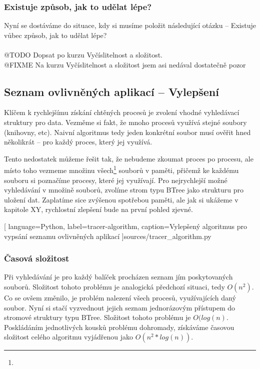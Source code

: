 \documentclass[10pt,a4paper]{article}
\begin{document}

			\subsubsection*{Existuje způsob, jak to udělat lépe?}
			Nyní se dostáváme do situace, kdy si musíme položit následující otázku -- Existuje vůbec způsob, jak to udělat lépe?
			\\
			\\
			@TODO Dopsat po kurzu Vyčíslitelnost a složitost.\\
			@FIXME Na kurzu Vyčíslitelnost a složitost jsem asi nedával dostatečně pozor

		\subsection{Seznam ovlivněných aplikací -- Vylepšení}
		Klíčem k rychlejšímu získání chtěných procesů je zvolení vhodné vyhledávací struktury pro data. Vezměme si fakt, že mnoho procesů využívá stejné soubory (knihovny, etc). Naivní algoritmus tedy jeden konkrétní soubor musí ověřit hned několikrát -- pro každý proces, který jej využívá.

		Tento nedostatek můžeme řešit tak, že nebudeme zkoumat proces po procesu, ale místo toho vezmeme množinu všech\footnote{} souborů v paměti, přičemž ke každému souboru si poznačíme procesy, které jej využívají. Pro nejrychlejší možné vyhledávání v množině souborů, zvolíme strom typu BTree jako strukturu pro uložení dat. Zaplatíme sice zvýšenou spotřebou paměti, ale jak si ukážeme v kapitole XY, rychlostní zlepšení bude na první pohled zjevné.

		
		[
			language={Python},
			label=tracer-algorithm,
			caption={Vylepšený algoritmus pro vypsání seznamu ovlivněných aplikací}
		]{sources/tracer_algorithm.py}

			\subsubsection*{Časová složitost}
			Při vyhledávání je pro každý balíček procházen seznam jím poskytovaných souborů. Složitost tohoto problému je analogická předchozí situaci, tedy $O(n^2)$. Co se ovšem změnilo, je problém nalezení všech procesů, využívajících daný soubor. Nyní si stačí vyzvednout jejich seznam jednorázovým přístupem do stromové struktury typu BTree. Složitost tohoto problému je $O(log(n)$. Poskládáním jednotlivých kousků problému dohromady, získáváme časovou složitost celého algoritmu vyjádřenou jako $O(n^2 * log(n))$.
\end{document}
